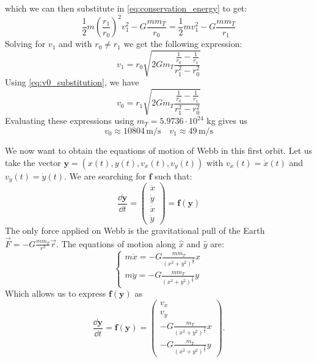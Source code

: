 which we can then substitute in \autoref{eq:conservation_energy} to get:
\begin{equation}
    \frac{1}{2} m \left(\frac{r_1}{r_0}\right)^2 v_1^2 - G \frac{m m_T}{r_0} = \frac{1}{2} m v_1^2 - G \frac{m m_T}{r_1}
\end{equation}
Solving for \(v_1\) and with $r_0 \neq r_1$ we get the following expression:
\begin{equation}
    v_1 = r_0 \sqrt{2 G m_T \frac{\frac{1}{r_0}-\frac{1}{r_1}}{r_1^2-r_0^2}}
\end{equation}
Using \autoref{eq:v0_substitution}, we have
\begin{equation}
    v_0 = r_1 \sqrt{2 G m_T \frac{\frac{1}{r_0}-\frac{1}{r_1}}{r_1^2-r_0^2}}
    \label{eq:v0_final}
\end{equation}
Evaluating these expressions using \(m_T = 5.9736 \cdot 10^{24}\) kg gives us
\begin{equation}
    v_0 \approx 10804 \, \textrm{m/s} \quad v_1 \approx 49 \, \textrm{m/s}
\end{equation}

We now want to obtain the equations of motion of Webb in this first orbit. Let us take the vector \(\mathbf{y} = (x(t), y(t), v_x(t), v_y(t))\) with $v_x(t) = \dot x(t)$ and $v_y(t) = \dot y(t)$. We are searching for \(\mathbf{f}\) such that:
\begin{equation}
    \frac{\dd \mathbf{y}}{\dd t} = \left(\begin{matrix} \dot x \\ \dot y \\ \ddot x \\ \ddot y \end{matrix}\right) = \mathbf{f}(\mathbf{y})
\end{equation}
The only force applied on Webb is the gravitational pull of the Earth $\vec{F} = -G \frac{m m_T}{r^3}\vec{r}$. The equations of motion along \(\hat{x}\) and \(\hat{y}\) are:
\begin{equation}
    \begin{cases}
        m \ddot x = -G \frac{m m_T}{\left(x^2+y^2\right)^\frac{3}{2}} x \\
        m \ddot y = -G \frac{m m_T}{\left(x^2+y^2\right)^\frac{3}{2}} y
    \end{cases}
\end{equation}
Which allows us to express \(\mathbf{f}(\mathbf{y})\) as
\begin{equation}
    \frac{\dd \mathbf{y}}{\dd t} = \mathbf{f}(\mathbf{y}) = \left(\begin{matrix} v_x \\ v_y \\ -G \frac{m_T}{\left(x^2+y^2\right)^\frac{3}{2}} x \\ -G \frac{m_T}{\left(x^2+y^2\right)^\frac{3}{2}} y \end{matrix}\right).
\end{equation}

